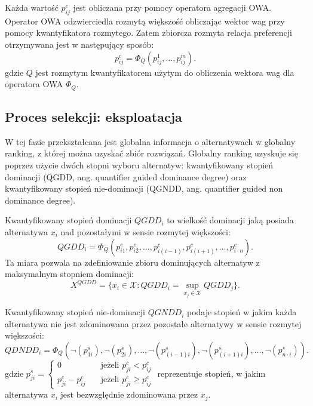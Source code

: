 Każda wartość $p^c_{ij}$ jest obliczana przy pomocy operatora agregacji OWA.
Operator OWA odzwierciedla rozmytą większość obliczając wektor wag przy pomocy
kwantyfikatora rozmytego. Zatem zbiorcza rozmyta relacja preferencji otrzymywana
jest w następujący sposób:
\begin{equation}
p^c_{ij} = \Phi_Q(p^1_{ij}, \dotsc, p^m_{ij}).
\end{equation}
gdzie $Q$ jest rozmytym kwantyfikatorem użytym do obliczenia wektora wag dla
operatora OWA $\Phi_Q$.

\subsection{Proces selekcji: eksploatacja}
W tej fazie przekształcana jest globalna informacja o alternatywach w globalny
ranking, z której można uzyskać zbiór rozwiązań. Globalny ranking uzyskuje się
poprzez użycie dwóch stopni wyboru alternatyw: kwantyfikowany stopień dominacji
(QGDD, ang. quantifier guided dominance degree) oraz kwantyfikowany stopień
nie-dominacji (QGNDD, ang. quantifier guided non dominance degree).

Kwantyfikowany stopień dominacji $QGDD_i$ to wielkość dominacji jaką posiada
alternatywa $x_i$ nad pozostałymi w sensie rozmytej większości:
\begin{equation}
QGDD_i = \Phi_Q(p^c_{i1}, p^c_{i2}, \dotsc, p^c_{i(i-1)},p^c_{i(i+1)}, \dotsc,
p^c_{i \cdot n}).
\end{equation}
Ta miara pozwala na zdefiniowanie zbioru dominujących alternatyw z maksymalnym
stopniem dominacji:
\begin{equation}
X^{QGDD} = \{ x_i \in \mathcal{X} : QGDD_i = \sup_{x_j \in \mathcal{X}} QGDD_j
\}.
\end{equation}

Kwantyfikowany stopień nie-dominacji $QGNDD_i$ podaje stopień w jakim każda
alternatywa nie jest zdominowana przez pozostałe alternatywy w sensie rozmytej
większości:
\begin{equation}
QDNDD_i = \Phi_Q(\neg(p^s_{1i}), \neg(p^s_{2i}), \dotsc,
\neg(p^s_{(i-1)i}), \neg(p^s_{(i+1)i}), \dotsc, \neg(p^s_{n \cdot i})).
\end{equation}
gdzie
$p^s_{ji} = 
  \left\{ 
	\begin{array}{ll}
	  0 				  & \quad \textrm{jeżeli } p^c_{ji} < p^c_{ij} \\
      p^c_{ji} - p^c_{ij} & \quad \textrm{jeżeli } p^c_{ji} \geq p^c_{ij}
  	\end{array} 
  \right.
$
reprezentuje stopień, w jakim alternatywa $x_i$ jest bezwzględnie zdominowana
przez $x_j$.


